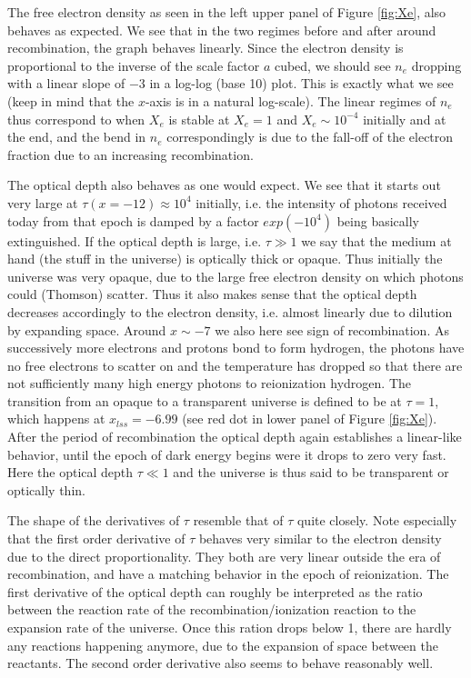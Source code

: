 \documentclass[twocolumn]{aastex62}
\begin{document}
The free electron density as seen in the left upper panel of Figure \ref{fig:Xe}, also behaves as expected. We see that in the two regimes before and after around recombination, the graph behaves linearly. Since the electron density is proportional to the inverse of the scale factor $a$ cubed, we should see $n_e$ dropping with a linear slope of $-3$ in a log-log (base 10) plot. This is exactly what we see (keep in mind that the $x$-axis is in a natural log-scale). The linear regimes of $n_e$ thus correspond to when $X_e$ is stable at $X_e = 1$ and $X_e\sim 10^{-4}$ initially and at the end, and the bend in $n_e$ correspondingly is due to the fall-off of the electron fraction due to an increasing recombination. 

The optical depth also behaves as one would expect. We see that it starts out very large at $\tau(x = -12) \approx 10^4$ initially, i.e. the intensity of photons received today from that epoch is damped by a factor $exp(-10^4)$ being basically extinguished. If the optical depth is large, i.e. $\tau \gg 1$ we say that the medium at hand (the stuff in the universe) is optically thick or opaque. Thus initially the universe was very opaque, due to the large free electron density on which photons could (Thomson) scatter. Thus it also makes sense that the optical depth decreases accordingly to the electron density, i.e. almost linearly due to dilution by expanding space. Around $x\sim -7$ we also here see sign of recombination. As successively more electrons and protons bond to form hydrogen, the photons have no free electrons to scatter on and the temperature has dropped so that there are not sufficiently many high energy photons to reionization hydrogen. The transition from an opaque to a transparent universe is defined to be at $\tau = 1$, which happens at $x_{lss} = -6.99$ (see red dot in lower panel of Figure \ref{fig:Xe}). After the period of recombination the optical depth again establishes a linear-like behavior, until the epoch of dark energy begins were it drops to zero very fast. Here the optical depth $\tau \ll 1$ and the universe is thus said to be transparent or optically thin.

The shape of the derivatives of $\tau$ resemble that of $\tau$ quite closely. Note especially that the first order derivative of $\tau$ behaves very similar to the electron density due to the direct proportionality. They both are very linear outside the era of recombination, and have a matching behavior in the epoch of reionization. The first derivative of the optical depth can roughly be interpreted as the ratio between the reaction rate of the recombination/ionization reaction to the expansion rate of the universe. Once this ration drops below 1, there are hardly any reactions happening anymore, due to the expansion of space between the reactants. The second order derivative also seems to behave reasonably well.
\end{document}
